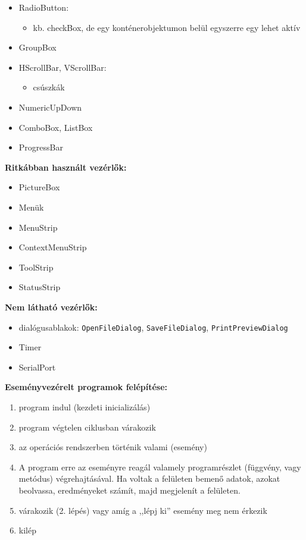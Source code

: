 \begin{itemize}
\begin{itemize}
        \item kijelölőnégyzet
    \end{itemize}
    \item RadioButton:
    \begin{itemize}
        \item kb. checkBox, de egy konténerobjektumon belül egyszerre egy lehet aktív
    \end{itemize}
    \item GroupBox
    \item HScrollBar, VScrollBar:
    \begin{itemize}
        \item csúszkák
    \end{itemize}
    \item NumericUpDown
    \item ComboBox, ListBox
    \item ProgressBar
\end{itemize}

\textbf{Ritkábban használt vezérlők:}
\begin{itemize}
    \item PictureBox
    \item Menük
    \item MenuStrip
    \item ContextMenuStrip
    \item ToolStrip
    \item StatusStrip
\end{itemize}

\textbf{Nem látható vezérlők:}
\begin{itemize}
    \item dialógusablakok: \texttt{OpenFileDialog}, \texttt{SaveFileDialog}, \texttt{PrintPreviewDialog}
    \item Timer
    \item SerialPort
\end{itemize}

\textbf{Eseményvezérelt programok felépítése:}
\begin{enumerate}
    \item program indul (kezdeti inicializálás)
    \item program végtelen ciklusban várakozik
    \item az operációs rendszerben történik valami (esemény)
    \item A program erre az eseményre reagál valamely programrészlet (függvény, vagy metódus) végrehajtásával. Ha voltak a felületen bemenő adatok, azokat beolvassa, eredményeket számít, majd megjelenít a felületen.
    \item várakozik (2. lépés) vagy amíg a ,,lépj ki'' esemény meg nem érkezik
    \item kilép
\end{enumerate}
